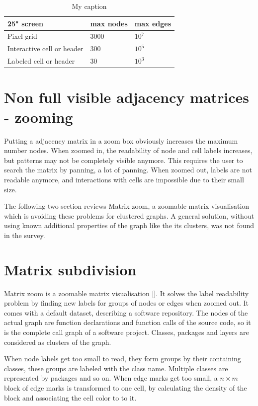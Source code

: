  
\begin{table}[]
\centering
\begin{tabular}{|l|l|l|}
\hline
25" screen                 & max nodes & max edges                \\ \hline
Pixel grid                 & 3000      & $10^7$                     \\ \hline
Interactive cell or header & 300       & $10^5$                     \\ \hline
Labeled cell or header     & 30        & $10^3$                     \\ \hline
\end{tabular}
\caption{My caption}
\label{my-label}
\end{table}



\section{Non full visible adjacency matrices - zooming}
Putting a adjacency matrix in a zoom box obviously increases the maximum number nodes. 
When zoomed in, the readability of node and cell labels increases, but patterns may not be completely visible anymore. This requires the user to search the matrix by panning, a lot of panning. When zoomed out, labels are not readable anymore, and interactions with cells are impossible due to their small size. 

The following two section reviews Matrix zoom, a zoomable matrix visualisation which is avoiding these problems for clustered graphs. A general solution, without using known additional properties of the graph like the its clusters, was not found in the survey.

\section{Matrix subdivision}

Matrix zoom is a zoomable matrix visualisation [\cite{ham}]. It solves the label readability problem by finding new labels for groups of nodes or edges when zoomed out. It comes with a default dataset, describing a software repository. The nodes of the actual graph are function declarations and function calls of the source code, so it is the complete call graph of a software project. Classes, packages and layers are considered as clusters of the graph. 

When node labels get too small to read, they form groups by their containing classes, these groups are labeled with the class name. Multiple classes are represented by packages and so on. When edge marks get too small, a $n \times m$ block of edge marks is transformed to one cell, by calculating the density of the block and associating the cell color to to it.

